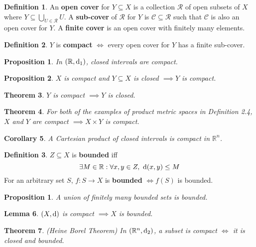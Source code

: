 \documentclass[12pt]{article}
\newtheorem{thm}{Theorem}[section]
\newtheorem{lem}[thm]{Lemma}
\newtheorem{cor}[thm]{Corollary}
\newtheorem{prop}[thm]{Proposition}
\newtheorem*{prop*}{Proposition}
\theoremstyle{definition}
\newtheorem{defn}{Definition}[section]
\renewcommand{\d}{{\textnormal{d}}}
\begin{document}
\begin{defn}
	An \textbf{open cover} for $Y \subseteq X$ is a collection $\mathcal{R}$ of open subsets of $X$ where $Y \subseteq \bigcup_{U \in \mathcal{R}}U$.
	A \textbf{sub-cover} of $\mathcal{R}$ for $Y$ is $\mathcal{C} \subseteq \mathcal{R}$ such that $\mathcal{C}$ is also an open cover for $Y$.
	A \textbf{finite cover} is an open cover with finitely many elements.
\end{defn}

\begin{defn}
	$Y$ is \textbf{compact} $\iff$ every open cover for $Y$ has a finite sub-cover.
\end{defn}

\begin{prop}
	In $(\mathbb{R}, \d_1)$, closed intervals are compact.
\end{prop}

\begin{prop}
	$X$ is compact and $Y \subseteq X$ is closed $\implies Y$ is compact.
\end{prop}

\begin{thm}
	$Y$ is compact $\implies Y$ is closed.
\end{thm}

\begin{thm}
	For both of the examples of product metric spaces in Definition 2.4, $X$ and $Y$ are compact $\implies X \times Y$ is compact.
\end{thm}

\begin{cor}
	A Cartesian product of closed intervals is compact in $\mathbb{R}^n$.
\end{cor}

\begin{defn}
	$Z \subseteq X$ is \textbf{bounded} iff
	$$\exists M \in \mathbb{R} : \forall x, y \in Z,\ \d(x, y) \leq M$$
	For an arbitrary set $S$, $f : S \to X$ is \textbf{bounded} $\iff f(S)$ is bounded.
\end{defn}

\begin{prop*}
	A union of finitely many bounded sets is bounded.
\end{prop*}

\begin{lem}
	$(X, \d)$ is compact $\implies X$ is bounded.
\end{lem}

\begin{thm}
	(Heine Borel Theorem)
	In $(\mathbb{R}^n, \d_2)$, a subset is compact $\iff$ it is closed and bounded.
\end{thm}
\end{document}
